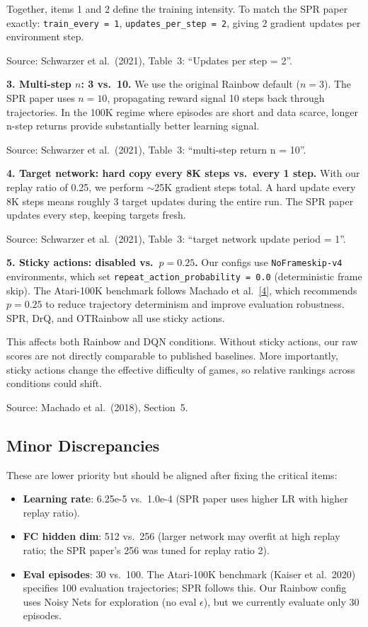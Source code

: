\documentclass[11pt]{article}
\newcommand{\citelink}[2]{\href{#1}{\small[#2]}}
\begin{document}
Together, items 1 and 2 define the training intensity. To match the
SPR paper exactly: \texttt{train\_every = 1},
\texttt{updates\_per\_step = 2}, giving 2 gradient updates per
environment step.

Source: Schwarzer et al.\ (2021), Table~3: ``Updates per step = 2''.

\medskip
\textbf{3. Multi-step $n$: 3 vs.\ 10.} We use the original Rainbow
default ($n=3$). The SPR paper uses $n=10$, propagating reward signal
10 steps back through trajectories. In the 100K regime where episodes
are short and data scarce, longer n-step returns provide
substantially better learning signal.

Source: Schwarzer et al.\ (2021), Table~3: ``multi-step return n = 10''.

\medskip
\textbf{4. Target network: hard copy every 8K steps vs.\ every 1
step.} With our replay ratio of 0.25, we perform $\sim$25K gradient
steps total. A hard update every 8K steps means roughly 3 target
updates during the entire run. The SPR paper updates every step,
keeping targets fresh.

Source: Schwarzer et al.\ (2021), Table~3: ``target network update
period = 1''.

\medskip
\textbf{5. Sticky actions: disabled vs.\ $p = 0.25$.}
Our configs use \texttt{NoFrameskip-v4} environments, which set
\texttt{repeat\_action\_probability\,=\,0.0} (deterministic frame
skip). The Atari-100K benchmark follows Machado et al.\
\citelink{https://arxiv.org/abs/1709.06009}{4}, which recommends
$p = 0.25$ to reduce trajectory determinism and improve evaluation
robustness. SPR, DrQ, and OTRainbow all use sticky actions.

This affects both Rainbow and DQN conditions. Without sticky actions,
our raw scores are not directly comparable to published baselines.
More importantly, sticky actions change the effective difficulty of
games, so relative rankings across conditions could shift.

Source: Machado et al.\ (2018), Section~5.

\subsection{Minor Discrepancies}

These are lower priority but should be aligned after fixing the
critical items:

\begin{itemize}[leftmargin=2em, itemsep=0.3em]
  \item \textbf{Learning rate}: 6.25e-5 vs.\ 1.0e-4 (SPR paper uses
    higher LR with higher replay ratio).
  \item \textbf{FC hidden dim}: 512 vs.\ 256 (larger network may
    overfit at high replay ratio; the SPR paper's 256 was tuned for
    replay ratio 2).
  \item \textbf{Eval episodes}: 30 vs.\ 100. The Atari-100K
    benchmark (Kaiser et al.\ 2020) specifies 100 evaluation
    trajectories; SPR follows this. Our Rainbow config uses Noisy
    Nets for exploration (no eval $\epsilon$), but we currently
    evaluate only 30 episodes.
\end{itemize}
\end{document}
